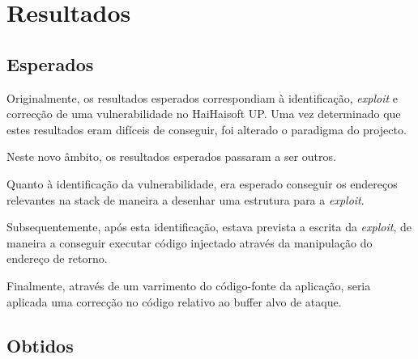 \documentclass[a4paper]{article}
\begin{document}
\pagebreak
\section{Resultados}



\subsection{Esperados}

Originalmente, os resultados esperados correspondiam à identificação, \textit{exploit} e correcção de uma vulnerabilidade no HaiHaisoft UP. Uma vez determinado que estes resultados eram difíceis de conseguir, foi alterado o paradigma do projecto.

Neste novo âmbito, os resultados esperados passaram a ser outros.

Quanto à identificação da vulnerabilidade, era esperado conseguir os endereços relevantes na stack de maneira a desenhar uma estrutura para a \textit{exploit}.

Subsequentemente, após esta identificação, estava prevista a escrita da \textit{exploit}, de maneira a conseguir executar código injectado através da manipulação do endereço de retorno.

Finalmente, através de um varrimento do código-fonte da aplicação, seria aplicada uma correcção no código relativo ao buffer alvo de ataque.

\subsection{Obtidos}


\pagebreak

\nocite{CorelanTeam, refx86asm, genSEHexploits, AMD64vol3_2013}
\end{document}
